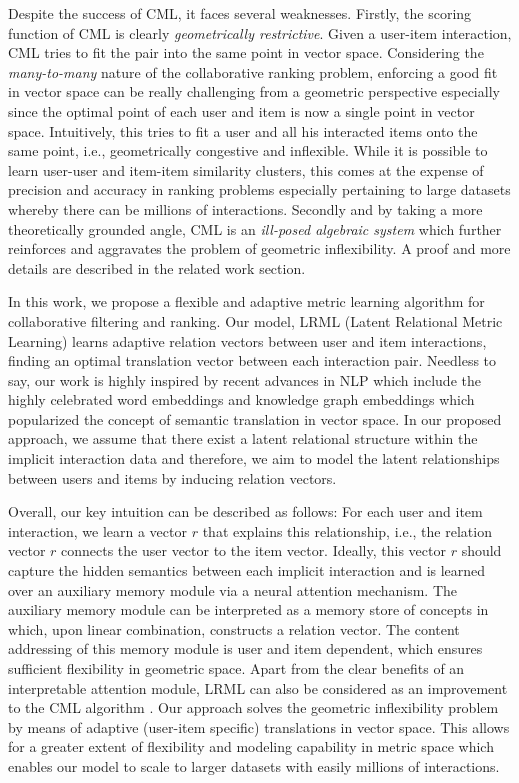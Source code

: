 \documentclass[sigconf]{acmart}
\begin{document}
Despite the success of CML, it faces several weaknesses. Firstly, the scoring function of CML is clearly \textit{geometrically restrictive}. Given a user-item interaction, CML tries to fit the pair into the same point in vector space. Considering the \textit{many-to-many} nature of the collaborative ranking problem, enforcing a good fit in vector space can be really challenging from a geometric perspective especially since the optimal point of each user and item is now a single point in vector space. Intuitively, this tries to fit a user and all his interacted items onto the same point, i.e., geometrically congestive and inflexible. While it is possible to learn user-user and item-item similarity clusters, this comes at the expense of precision and accuracy in ranking problems especially pertaining to large datasets whereby there can be millions of interactions. Secondly and by taking a more theoretically grounded angle, CML is an \textit{ill-posed algebraic system} \cite{illposed} which further reinforces and aggravates the problem of geometric inflexibility. A proof and more details are described in the related work section. 

In this work, we propose a flexible and adaptive metric learning algorithm for collaborative filtering and ranking. Our model, LRML (Latent Relational Metric Learning) learns adaptive relation vectors between user and item interactions, finding an optimal translation vector between each interaction pair. Needless to say, our work is highly inspired by recent advances in NLP which include the highly celebrated word embeddings \cite{DBLP:conf/nips/MikolovSCCD13} and knowledge graph embeddings \cite{DBLP:conf/nips/BordesUGWY13,DBLP:conf/aaai/LinLSLZ15,DBLP:conf/aaai/TayLH17} which popularized the concept of semantic translation in vector space. In our proposed approach, we assume that there exist a latent relational structure within the implicit interaction data and therefore, we aim to model the latent relationships between users and items by inducing relation vectors. 

Overall, our key intuition can be described as follows: For each user and item interaction, we learn a vector $r$ that explains this relationship, i.e., the relation vector $r$ connects the user vector to the item vector. Ideally, this vector $r$ should capture the hidden semantics between each implicit interaction and is learned over an auxiliary memory module via a neural attention mechanism. The auxiliary memory module can be interpreted as a memory store of concepts in which, upon linear combination, constructs a relation vector. The content addressing of this memory module is user and item dependent, which ensures sufficient flexibility in geometric space. Apart from the clear benefits of an interpretable attention module, LRML can also be considered as an improvement to the CML algorithm \cite{DBLP:conf/www/HsiehYCLBE17}. Our approach solves the geometric inflexibility problem by means of adaptive (user-item specific) translations in vector space. This allows for a greater extent of flexibility and modeling capability in metric space which enables our model to scale to larger datasets with easily millions of interactions. 
\end{document}
